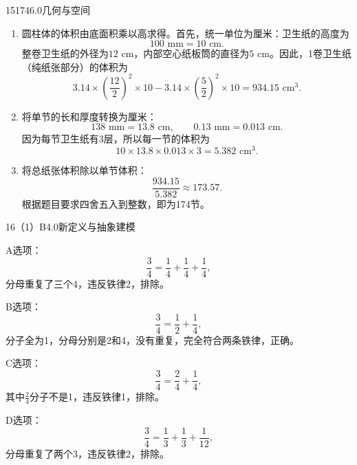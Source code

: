 \begin{solution}{15}{174}{6.0}{几何与空间}

\begin{enumerate}[label=\textbf{Step \arabic*:},leftmargin=*]
  \item 圆柱体的体积由底面积乘以高求得。首先，统一单位为厘米：卫生纸的高度为
  \[
    100\text{ mm}=10\text{ cm}.
  \]
  整卷卫生纸的外径为\(12\text{ cm}\)，内部空心纸板筒的直径为\(5\text{ cm}\)。因此，1卷卫生纸（纯纸张部分）的体积为
  \[
    3.14\times\left(\frac{12}{2}\right)^2\times10
    -3.14\times\left(\frac{5}{2}\right)^2\times10
    =934.15\text{ cm}^3.
  \]

  \item 将单节的长和厚度转换为厘米：
  \[
    138\text{ mm}=13.8\text{ cm},\qquad
    0.13\text{ mm}=0.013\text{ cm}.
  \]
  因为每节卫生纸有3层，所以每一节的体积为
  \[
    10\times13.8\times0.013\times3=5.382\text{ cm}^3.
  \]

  \item 将总纸张体积除以单节体积：
  \[
    \frac{934.15}{5.382}\approx173.57.
  \]
  根据题目要求四舍五入到整数，即为174节。
\end{enumerate}

\end{solution}


\begin{solution}{16（1）}{B}{4.0}{新定义与抽象建模}

A选项：
\[
  \frac34=\frac14+\frac14+\frac14,
\]
分母重复了三个4，违反铁律2，排除。

B选项：
\[
  \frac34=\frac12+\frac14,
\]
分子全为1，分母分别是2和4，没有重复，完全符合两条铁律，正确。

C选项：
\[
  \frac34=\frac24+\frac14,
\]
其中\(\frac24\)分子不是1，违反铁律1，排除。

D选项：
\[
  \frac34=\frac13+\frac13+\frac1{12},
\]
分母重复了两个3，违反铁律2，排除。

\end{solution}

